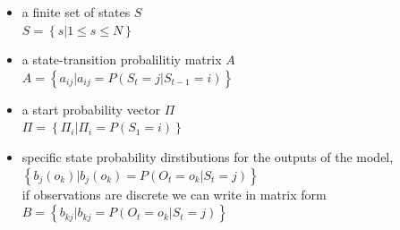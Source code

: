 \begin{itemize}
	\item a finite set of states $S$ \\ 
	$ S = \left\{s | 1 \leq s \leq N \right\} $
	\item a state-transition probalilitiy matrix $A$ \\ 
	$A = \left\{ a_{ij} | a_{ij} = P(S_t = j | S_{t-1} = i) \right\}$
	\item a start probability vector $\Pi$ \\ 
	$ \Pi = \left\{ \Pi_i | \Pi_i = P(S_1 = i)  \right\}$
	\item specific state probability dirstibutions for the outputs of the model,  \\
	$\left\{ b_j(o_k) | b_j(o_k) = P(O_t = o_k | S_t = j) \right\}$ \\
	if observations are discrete we can write in matrix form \\
	$ B = \left\{ b_{kj} | b_{kj} = P(O_t = o_k | S_t = j) \right\} $
\end{itemize}